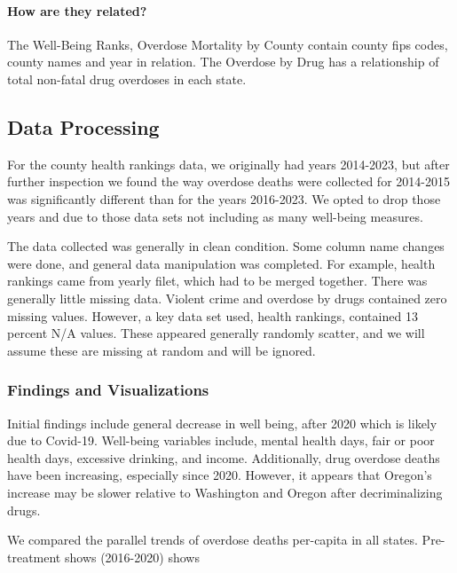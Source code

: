 \documentclass[
]{article}
\begin{document}
\hypertarget{how-are-they-related}{%
\paragraph{How are they related?}\label{how-are-they-related}}

The Well-Being Ranks, Overdose Mortality by County contain county fips
codes, county names and year in relation. The Overdose by Drug has a
relationship of total non-fatal drug overdoses in each state.

\hypertarget{data-processing}{%
\subsection{Data Processing}\label{data-processing}}

For the county health rankings data, we originally had years 2014-2023,
but after further inspection we found the way overdose deaths were
collected for 2014-2015 was significantly different than for the years
2016-2023. We opted to drop those years and due to those data sets not
including as many well-being measures.

The data collected was generally in clean condition. Some column name
changes were done, and general data manipulation was completed. For
example, health rankings came from yearly filet, which had to be merged
together. There was generally little missing data. Violent crime and
overdose by drugs contained zero missing values. However, a key data set
used, health rankings, contained 13 percent N/A values. These appeared
generally randomly scatter, and we will assume these are missing at
random and will be ignored.

\hypertarget{findings-and-visualizations}{%
\subsubsection{Findings and
Visualizations}\label{findings-and-visualizations}}

Initial findings include general decrease in well being, after 2020
which is likely due to Covid-19. Well-being variables include, mental
health days, fair or poor health days, excessive drinking, and income.
Additionally, drug overdose deaths have been increasing, especially
since 2020. However, it appears that Oregon's increase may be slower
relative to Washington and Oregon after decriminalizing drugs.

We compared the parallel trends of overdose deaths per-capita in all
states. Pre-treatment shows (2016-2020) shows
\end{document}
